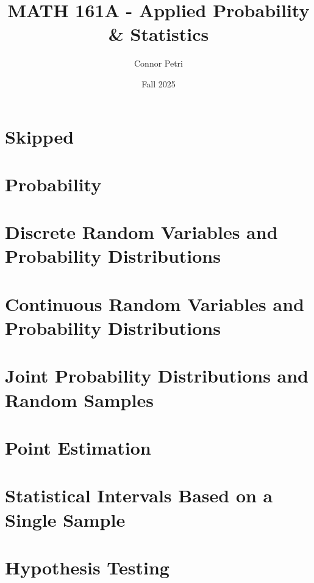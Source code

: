 \documentclass[12pt, letterpaper]{article}
\title{MATH 161A - Applied Probability \& Statistics}
\author{Connor Petri}
\date{Fall 2025}
\begin{document}
\maketitle
\pagebreak
\tableofcontents
\pagebreak

\section{Skipped}
\pagebreak

\section{Probability}
\pagebreak

\pagebreak

\pagebreak

\pagebreak

\pagebreak

\pagebreak

\section{Discrete Random Variables and Probability Distributions}
\pagebreak

\pagebreak

\pagebreak

\pagebreak

\pagebreak

\pagebreak

\pagebreak

\section{Continuous Random Variables and Probability Distributions}
\pagebreak

\pagebreak

\pagebreak

\pagebreak

\pagebreak

\section{Joint Probability Distributions and Random Samples}
\pagebreak

\pagebreak

\pagebreak

\pagebreak

\pagebreak

\pagebreak

\section{Point Estimation}
\pagebreak

\pagebreak

\section{Statistical Intervals Based on a Single Sample}
\pagebreak

\pagebreak

\pagebreak
% 

\section{Hypothesis Testing}
\pagebreak

\pagebreak
% 
% 
\end{document}
